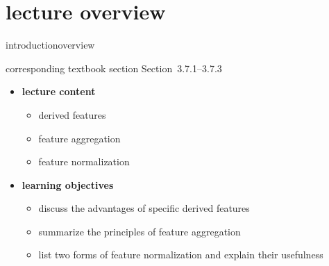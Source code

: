 

\subtitle{Module 3.7.1: Feature Post-Processing}


	

    \section[overview]{lecture overview}
        \begin{frame}{introduction}{overview}
            \begin{block}{corresponding textbook section}
                    Section~3.7.1--3.7.3
            \end{block}

            \begin{itemize}
                \item   \textbf{lecture content}
                    \begin{itemize}
                        \item       derived features
                        \item       feature aggregation
                        \item       feature normalization
                    \end{itemize}
                \bigskip
                \item<2->   \textbf{learning objectives}
                    \begin{itemize}
                        \item       discuss the advantages of specific derived features
                        \item       summarize the principles of feature aggregation
                        \item       list two forms of feature normalization and explain their usefulness
                    \end{itemize}
            \end{itemize}
        \end{frame}

